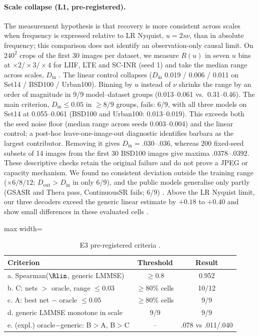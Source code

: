 \paragraph{Scale collapse (L1, pre-registered).} The measurement hypothesis is that recovery is more consistent across scales when frequency is expressed relative to LR Nyquist, $u=2s\nu$, than in absolute frequency; this comparison does not identify an observation-only causal limit. On
$240^2$ crops of the first 30 images per dataset, we measure $R(u)$ in seven
$u$ bins at $\times2/\times3/\times4$ for LIIF, LTE and SC-INR (seed 1) and
take the median range across scales, $D_{\mathrm{in}}$ . The
linear control collapses ($D_{\mathrm{in}}$ 0.019 / 0.006 / 0.011 on Set14 /
BSD100 / Urban100). Binning by $u$ instead of $\nu$ shrinks the range by an
order of magnitude in 9/9 model--dataset groups (0.013--0.061 vs.\
0.31--0.46). The main criterion, $D_{\mathrm{in}}\le0.05$ in $\ge8/9$ groups,
fails: 6/9, with all three models on Set14 at 0.055--0.061 (BSD100 and
Urban100: 0.013--0.019). This exceeds both the seed noise floor (median range
across seeds 0.003--0.004) and the linear control; a post-hoc leave-one-image-out diagnostic identifies barbara as the largest contributor. Removing it gives $D_{\mathrm{in}}=.030$--$.036$, whereas 200 fixed-seed subsets of 14 images from the first 30 BSD100 images give maxima $.0378$--$.0392$. These descriptive checks retain the original failure and do not prove a JPEG or capacity mechanism. We found no consistent deviation outside the training range
($\times6/8/12$; $D_{\mathrm{out}}>D_{\mathrm{in}}$ in only 6/9), and the
public models generalise only partly (GSASR and Thera pass, ContinuousSR
fails; 6/9) . Above the LR Nyquist limit, our three decoders
exceed the generic linear estimate by $+0.18$ to $+0.40$ and show small differences in these evaluated cells \src{L1L2}.

\begin{table}[t]\centering\small
\caption{E3 pre-registered criteria .}\label{tab:e3}
\begin{adjustbox}{max width=\linewidth}\begin{tabular}{lcc}\toprule
Criterion & Threshold & Result\\\midrule
a. Spearman($\Rlin$, generic LMMSE) & $\ge0.8$ & 0.952\\
b. C: nets $>$ oracle, range $\le0.03$ & $\ge80\%$ cells & 10/12\\
c. A: best net $-$ oracle $\le0.05$ & $\ge80\%$ cells & 9/9\\
d. generic LMMSE monotone in scale & 9/9 & 9/9\\
e. (expl.) oracle$-$generic: B$>$A, B$>$C & -- & .078 vs .011/.040\\
\bottomrule\end{tabular}\end{adjustbox}
\end{table}


